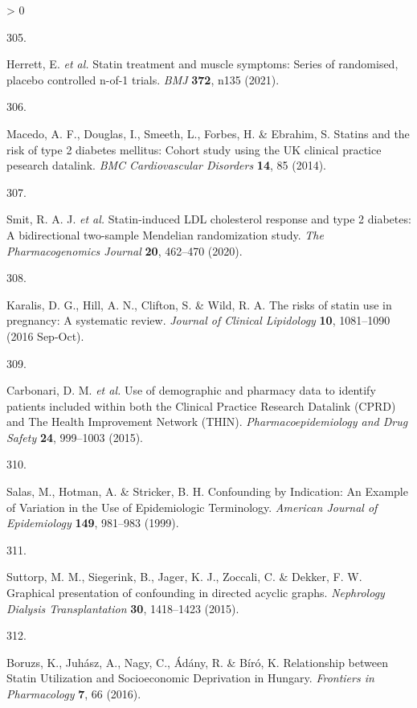 \documentclass[a4paper, twoside]{templates/ociamthesis}
\newlength{\cslhangindent}
\newlength{\csllabelwidth}
\newenvironment{CSLReferences}[3] %
 {%
  \setlength{\parindent}{0pt}
  \ifodd #1 \everypar{\setlength{\hangindent}{\cslhangindent}}\ignorespaces\fi
  \ifnum #2 > 0
  \setlength{\parskip}{#2\baselineskip}
  \fi
 }%
 {}
\newcommand{\CSLLeftMargin}[1]{\parbox[t]{\maxof{\widthof{#1}}{\csllabelwidth}}{#1}}
\newcommand{\CSLRightInline}[1]{\parbox[t]{\linewidth - \csllabelwidth}{#1}}
\begin{document}
\begin{CSLReferences}{0}{0}
\leavevmode\hypertarget{ref-herrett2021}{}%
\CSLLeftMargin{305. }
\CSLRightInline{Herrett, E. \emph{et al.} Statin treatment and muscle symptoms: Series of randomised, placebo controlled n-of-1 trials. \emph{BMJ} \textbf{372}, n135 (2021).}

\leavevmode\hypertarget{ref-macedo2014}{}%
\CSLLeftMargin{306. }
\CSLRightInline{Macedo, A. F., Douglas, I., Smeeth, L., Forbes, H. \& Ebrahim, S. Statins and the risk of type 2 diabetes mellitus: Cohort study using the {UK} clinical practice pesearch datalink. \emph{BMC Cardiovascular Disorders} \textbf{14}, 85 (2014).}

\leavevmode\hypertarget{ref-smit2020}{}%
\CSLLeftMargin{307. }
\CSLRightInline{Smit, R. A. J. \emph{et al.} Statin-induced {LDL} cholesterol response and type 2 diabetes: A bidirectional two-sample {Mendelian} randomization study. \emph{The Pharmacogenomics Journal} \textbf{20}, 462--470 (2020).}

\leavevmode\hypertarget{ref-karalis2016}{}%
\CSLLeftMargin{308. }
\CSLRightInline{Karalis, D. G., Hill, A. N., Clifton, S. \& Wild, R. A. The risks of statin use in pregnancy: A systematic review. \emph{Journal of Clinical Lipidology} \textbf{10}, 1081--1090 (2016 Sep-Oct).}

\leavevmode\hypertarget{ref-carbonari2015}{}%
\CSLLeftMargin{309. }
\CSLRightInline{Carbonari, D. M. \emph{et al.} Use of demographic and pharmacy data to identify patients included within both the {Clinical Practice Research Datalink} ({CPRD}) and {The Health Improvement Network} ({THIN}). \emph{Pharmacoepidemiology and Drug Safety} \textbf{24}, 999--1003 (2015).}

\leavevmode\hypertarget{ref-salas1999}{}%
\CSLLeftMargin{310. }
\CSLRightInline{Salas, M., Hotman, A. \& Stricker, B. H. Confounding by {Indication}: An {Example} of {Variation} in the {Use} of {Epidemiologic Terminology}. \emph{American Journal of Epidemiology} \textbf{149}, 981--983 (1999).}

\leavevmode\hypertarget{ref-suttorp2015}{}%
\CSLLeftMargin{311. }
\CSLRightInline{Suttorp, M. M., Siegerink, B., Jager, K. J., Zoccali, C. \& Dekker, F. W. Graphical presentation of confounding in directed acyclic graphs. \emph{Nephrology Dialysis Transplantation} \textbf{30}, 1418--1423 (2015).}

\leavevmode\hypertarget{ref-boruzs2016}{}%
\CSLLeftMargin{312. }
\CSLRightInline{Boruzs, K., Juhász, A., Nagy, C., Ádány, R. \& Bíró, K. Relationship between {Statin Utilization} and {Socioeconomic Deprivation} in {Hungary}. \emph{Frontiers in Pharmacology} \textbf{7}, 66 (2016).}


\end{CSLReferences}
\end{document}
